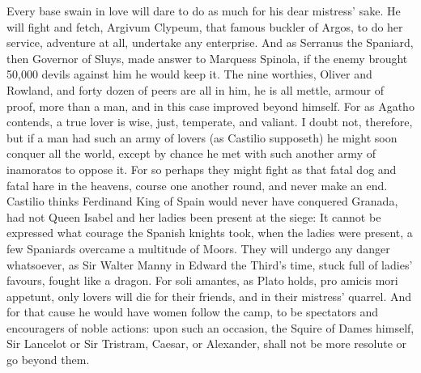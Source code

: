 Every base swain in love will dare to do as much for his dear mistress'
sake. He will fight and fetch, Argivum Clypeum, that famous
buckler of Argos, to do her service, adventure at all, undertake any
enterprise. And as Serranus the Spaniard, then Governor of Sluys, made
answer to Marquess Spinola, if the enemy brought 50,000 devils against
him he would keep it. The nine worthies, Oliver and Rowland, and forty
dozen of peers are all in him, he is all mettle, armour of proof, more
than a man, and in this case improved beyond himself. For as
Agatho contends, a true lover is wise, just, temperate, and
valiant. I doubt not, therefore, but if a man had such an army of
lovers (as Castilio supposeth) he might soon conquer all the world,
except by chance he met with such another army of inamoratos to oppose
it. For so perhaps they might fight as that fatal dog and fatal
hare in the heavens, course one another round, and never make an end.
Castilio thinks Ferdinand King of Spain would never have conquered
Granada, had not Queen Isabel and her ladies been present at the siege:
It cannot be expressed what courage the Spanish knights took,
when the ladies were present, a few Spaniards overcame a multitude of
Moors. They will undergo any danger whatsoever, as Sir Walter Manny in
Edward the Third's time, stuck full of ladies' favours, fought like a
dragon. For soli amantes, as Plato holds, pro amicis mori
appetunt, only lovers will die for their friends, and in their
mistress' quarrel. And for that cause he would have women follow the
camp, to be spectators and encouragers of noble actions: upon such an
occasion, the Squire of Dames himself, Sir Lancelot or Sir
Tristram, Caesar, or Alexander, shall not be more resolute or go beyond
them.

